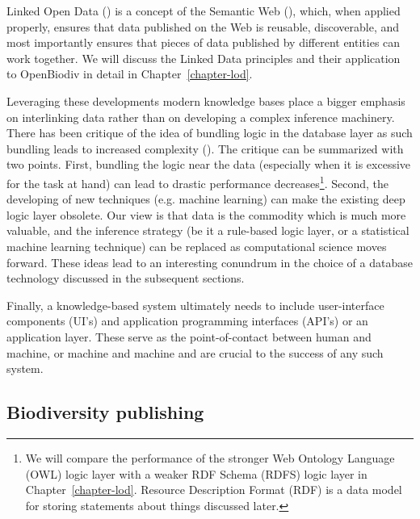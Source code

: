 Linked Open Data (\cite{heath_linked_2011}) is a concept of the Semantic Web (\cite{berners-lee_semantic_2001}), which, when applied properly, ensures that data published on the Web is reusable, discoverable, and most importantly ensures that pieces of data published by different entities can work together.  We will discuss the Linked Data principles and their application to OpenBiodiv in detail in Chapter~\ref{chapter-lod}.

Leveraging these developments modern knowledge bases place a bigger emphasis on interlinking data rather than on developing a complex inference machinery. There has been critique of the idea of bundling logic in the database layer as such bundling leads to increased complexity (\cite{barrasa_rdf_2017}). The critique can be summarized with two points. First, bundling the logic near the data (especially when it is excessive for the task at hand) can lead to drastic performance decreases\footnote{ We will compare the performance of the stronger Web Ontology Language (OWL) logic layer with a weaker RDF Schema (RDFS) logic layer in Chapter~\ref{chapter-lod}. Resource Description Format (RDF) is a data model for storing statements about things discussed later.}. Second, the developing of new techniques (e.g. machine learning) can make the existing deep logic layer obsolete. Our view is that data is the commodity which is much more valuable, and the inference strategy (be it a rule-based logic layer, or a statistical machine learning technique) can be replaced as computational science moves forward. These ideas lead to an interesting conundrum in the choice of a database technology discussed in the subsequent sections.

Finally, a knowledge-based system ultimately needs to include user-interface components (UI's) and application programming interfaces (API's) or an application layer. These serve as the point-of-contact between human and machine, or machine and machine and are crucial to the success of any such system.

\subsection*{Biodiversity publishing}

